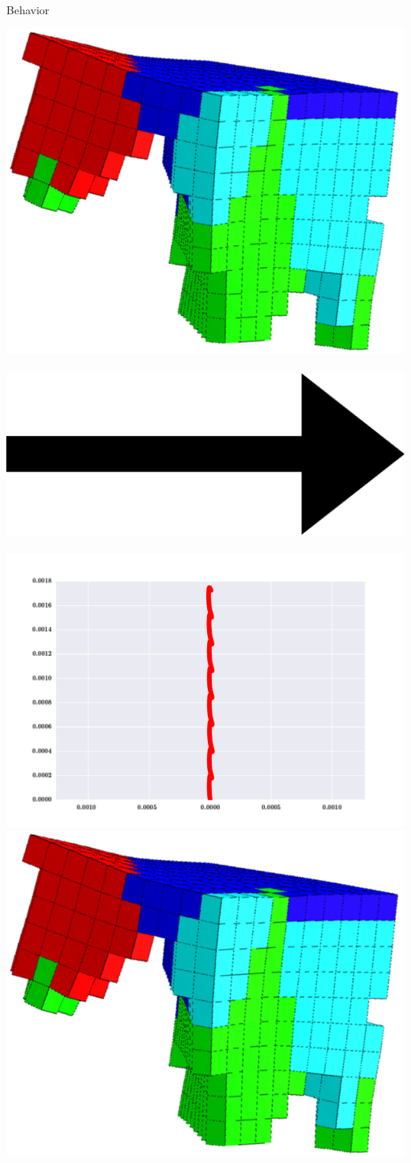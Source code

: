 \documentclass{beamer}
\begin{document}
\begin{frame}{Behavior}
\begin{center}
\includegraphics[height=0.15\textheight]{../Figures/Misc/unshacklingEvolutionFigure2.png}\	
\includegraphics[height=0.05\textheight]{../Figures/Misc/Arrow_east.eps}\	
\includegraphics[height=0.15\textwidth]{../Figures/Behaviors/03.pdf}
\\
\includegraphics[height=0.15\textheight]{../Figures/Misc/unshacklingEvolutionFigure2.png}\	

\end{center}
\end{frame}
\end{document}
